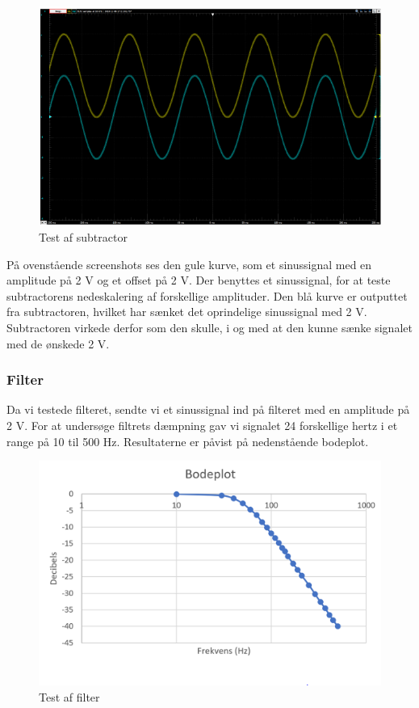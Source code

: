 \begin{figure}[h!]
	\centering
	\includegraphics[width=0.72\linewidth]{../Rapport/Implementering_og_test/Hardware/subtractor}
	\caption{Test af subtractor}
	\label{fig:subtractor}
\end{figure}

På ovenstående screenshots ses den gule kurve, som et sinussignal med en amplitude på 2 V og et offset på 2 V. Der benyttes et sinussignal, for at teste subtractorens nedeskalering af forskellige amplituder. Den blå kurve er outputtet fra subtractoren, hvilket har sænket det oprindelige sinussignal med 2 V. Subtractoren virkede derfor som den skulle, i og med at den kunne sænke signalet med de ønskede 2 V.

\clearpage

\subsubsection{Filter}

Da vi testede filteret, sendte vi et sinussignal ind på filteret med en amplitude på 2 V. For at undersøge filtrets dæmpning gav vi signalet 24 forskellige hertz i et range på 10 til 500 Hz. Resultaterne er påvist på nedenstående bodeplot.

\begin{figure}[h!]
	\centering
	\includegraphics[width=0.8\linewidth]{../Rapport/Implementering_og_test/Hardware/filter}
	\caption{Test af filter}
	\label{fig:filter}
\end{figure}

